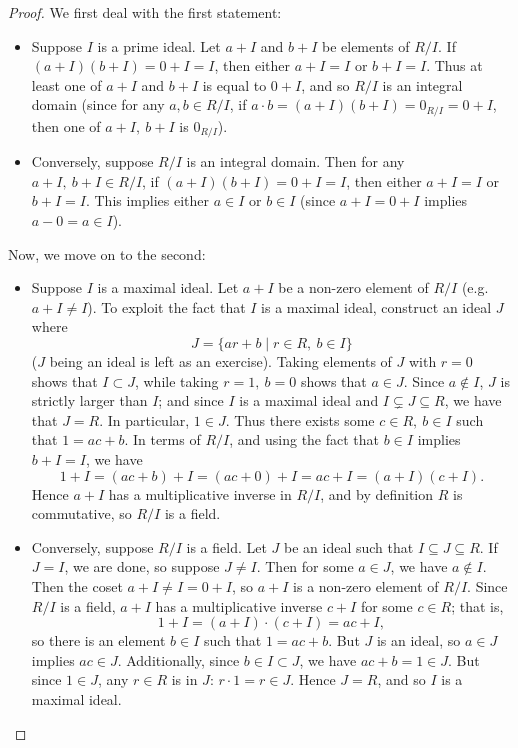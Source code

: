 \documentclass[math1530-lecture-notes]{subfiles}
\begin{document}
\begin{proof}[Proof]
  We first deal with the first statement:
  \begin{itemize}
    \item Suppose $I$ is a prime ideal. Let $a+I$ and $b+I$ be elements of $R / I$. If
      $(a+I)(b+I)=0+I=I$, then either $a+I=I$ or $b+I=I$. Thus at least one of $a+I$ and $b+I$ is
      equal to $0+I$, and so $R / I$ is an integral domain (since for any $a,b\in R / I$, if $a\cdot
      b=(a+I)(b+I)=0_{R / I}=0+I$, then one of $a+I,\ b+I$ is $0_{R / I}$).
    \item Conversely, suppose $R / I$ is an integral domain. Then for any $a+I,\ b+I\in R / I$, if
      $(a+I)(b+I)=0+I=I$, then either $a+I=I$ or $b+I=I$. This implies either $a\in I$ or $b\in I$ 
      (since $a+I=0+I$ implies $a-0=a\in I$).
  \end{itemize}
  Now, we move on to the second:
  \begin{itemize}
    \item Suppose $I$ is a maximal ideal. Let $a+I$ be a non-zero element of $R / I$ (e.g. $a+I\neq
      I$). To exploit the fact that $I$ is a maximal ideal, construct an ideal $J$ where \[
        J = \{ar+b\mid r\in R,\ b\in I\} 
      \] ($J$ being an ideal is left as an exercise). Taking elements of $J$ with $r=0$ shows that
      $I\subset J$, while taking $r=1,\ b=0$ shows that $a\in J$.  Since $a\not\in I$, $J$ is
      strictly larger than $I$; and since $I$ is a maximal ideal and $I\subsetneq J \subseteq R$, we
      have that $J=R$. In particular, $1\in J$. Thus there exists some $c\in R,\ b\in I$ such that
      $1=ac+b$. In terms of $R / I$, and using the fact that $b\in I$ implies $b+I=I$, we have \[
        1+I=(ac+b)+I=(ac+0)+I=ac+I=(a+I)(c+I)
      .\] Hence $a+I$ has a multiplicative inverse in $R / I$, and by definition $R$ is commutative,
      so $R / I$ is a field.
    \item Conversely, suppose $R / I$ is a field. Let $J$ be an ideal such that $I\subseteq
      J\subseteq R$. If $J=I$, we are done, so suppose $J\neq I$. Then for some $a\in J$, we have
      $a\not\in I$. Then the coset $a+I\neq I=0+I$, so $a+I$ is a non-zero element of $R / I$. Since
      $R / I$ is a field, $a+I$ has a multiplicative inverse $c+I$ for some $c\in R$; that is, \[
        1 + I = (a+I)\cdot (c+I)=ac+I
      ,\] so there is an element $b\in I$ such that $1=ac+b$. But $J$ is an ideal, so $a\in J$
      implies $ac\in J$. Additionally, since $b\in I\subset J$, we have $ac+b=1\in J$. But since
      $1\in J$, any $r\in R$ is in $J$: $r\cdot 1=r\in J$. Hence $J=R$, and so $I$ is a maximal
      ideal.
  \end{itemize}
\end{proof}
\end{document}
